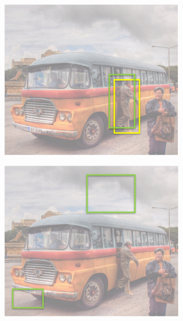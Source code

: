 \documentclass{article}
\begin{document}
\begin{figure}[h]
  \begin{subfigure}{0.32\textwidth}
    \includegraphics[width=\linewidth]{true_pos.jpg}
    \caption{}
  \end{subfigure}
  \hspace*{\fill} %
  \begin{subfigure}{0.32\textwidth}
    \includegraphics[width=\linewidth]{false_pos.jpg}

\end{subfigure}
\end{figure}
\end{document}
